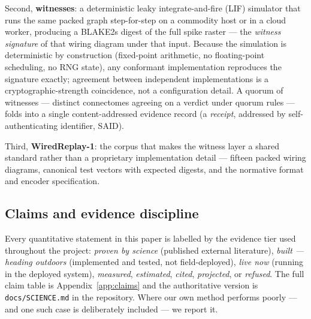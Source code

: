 \documentclass[pdflatex,sn-basic]{sn-jnl}
\begin{document}
Second, \textbf{witnesses}: a deterministic leaky
integrate-and-fire (LIF) simulator that runs the same packed graph
step-for-step on a commodity host or in a cloud worker, producing a
BLAKE2s digest of the full spike raster --- the \emph{witness
signature} of that wiring diagram under that input. Because the
simulation is deterministic by construction (fixed-point arithmetic,
no floating-point scheduling, no RNG state), any conformant
implementation reproduces the signature exactly; agreement between
independent implementations is a cryptographic-strength coincidence,
not a configuration detail. A quorum of witnesses --- distinct
connectomes agreeing on a verdict under quorum rules --- folds into a
single content-addressed evidence record (a \emph{receipt}, addressed
by self-authenticating identifier, SAID).

Third, \textbf{WiredReplay-1}: the corpus that makes the witness layer
a shared standard rather than a proprietary implementation detail ---
fifteen packed wiring diagrams, canonical test vectors with expected
digests, and the normative format and encoder specification.

\subsection{Claims and evidence discipline}
Every quantitative statement in this paper is labelled by the
evidence tier used throughout the project: \emph{proven by
science} (published external literature), \emph{built --- heading
outdoors} (implemented and tested, not field-deployed),
\emph{live now} (running in the deployed system), \emph{measured},
\emph{estimated}, \emph{cited}, \emph{projected}, or
\emph{refused}. The full claim table is Appendix~\ref{app:claims} and
the authoritative version is \texttt{docs/SCIENCE.md} in the
repository. Where our own method performs poorly --- and one such
case is deliberately included --- we report it.
\end{document}
